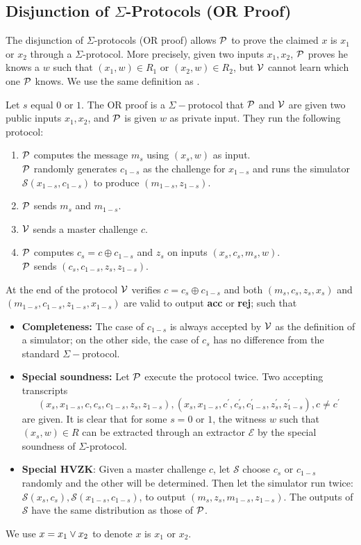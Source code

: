 \subsection{Disjunction of $\Sigma$-Protocols (OR Proof)}
The disjunction of $\Sigma$-protocols (OR proof) allows $\mathcal{P}$ to prove the claimed $x$ is $x_1$ or $x_2$ through a $\Sigma$-protocol. More precisely, given two inputs $x_1,x_2$, $\mathcal{P}$ proves he knows a $w$ such that $(x_1,w)\in{R_1}$ or $(x_2,w)\in{R_2}$, but $\mathcal{V}$ cannot learn which one $\mathcal{P}$ knows. We use the same definition as \cite{damgard10}.
\begin{definition}
Let $s$ equal $0$ or $1$. The OR proof is a $\Sigma-$protocol that $\mathcal{P}$ and $\mathcal{V}$ are given two public inputs $x_1,x_2$, and $\mathcal{P}$ is given $w$ as private input. They run the following protocol:
\begin{enumerate}
    \item $\mathcal{P}$ computes the message $m_s$ using $(x_s,w)$ as input. \\
    $\mathcal{P}$ randomly generates $c_{1-s}$ as the challenge for $x_{1-s}$ and runs the simulator $\mathcal{S}(x_{1-s},c_{1-s})$ to produce $(m_{1-s},z_{1-s})$.
    \item $\mathcal{P}$ sends $m_s$ and $m_{1-s}$.
    \item $\mathcal{V}$ sends a master challenge $c$.
    \item $\mathcal{P}$ computes $c_s=c\oplus{c_{1-s}}$ and $z_s$ on inputs $(x_s,c_s,m_s,w)$. \\
    $\mathcal{P}$ sends $(c_s,c_{1-s},z_s,z_{1-s})$.
\end{enumerate}
At the end of the protocol $\mathcal{V}$ verifies $c=c_s\oplus{c_{1-s}}$ and both $(m_s,c_s,z_s,x_s)$ and $(m_{1-s},c_{1-s},z_{1-s},x_{1-s})$ are valid to output \textbf{acc} or \textbf{rej}; such that
\begin{itemize}
    \item \textbf{Completeness:} The case of $c_{1-s}$ is always accepted by $\mathcal{V}$ as the definition of a simulator; on the other side, the case of $c_s$ has no difference from the standard $\Sigma-$protocol.
    \item \textbf{Special soundness:} Let $\mathcal{P}$ execute the protocol twice. Two accepting transcripts
    \[ (x_s,x_{1-s},c,c_s,c_{1-s},z_s,z_{1-s}),(x_s,x_{1-s},c^\prime,c_s^\prime,c_{1-s}^\prime,z_s^\prime,z_{1-s}^\prime),c\ne{c^\prime} \] 
    are given. It is clear that for some $s=0$ or $1$, the witness $w$ such that $(x_s,w)\in{R}$ can be extracted through an extractor $\mathcal{E}$ by the special soundness of $\Sigma$-protocol.
    \item \textbf{Special HVZK}: Given a master challenge $c$, let $\mathcal{S}$ choose $c_s$ or $c_{1-s}$ randomly and the other will be determined. Then let the simulator run twice: $\mathcal{S}(x_s,c_s),\mathcal{S}(x_{1-s},c_{1-s})$, to output $(m_s,z_s,m_{1-s},z_{1-s})$. The outputs of $\mathcal{S}$ have the same distribution as those of $\mathcal{P}$.
\end{itemize}
\end{definition}
We use $x={x_1\lor{x_2}}$ to denote $x$ is $x_1$ or $x_2$.

